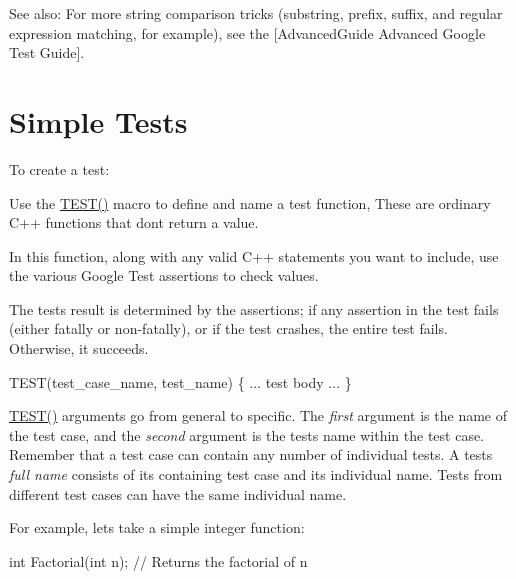 See also\+: For more string comparison tricks (substring, prefix, suffix, and regular expression matching, for example), see the \mbox{[}Advanced\+Guide Advanced Google Test Guide\mbox{]}.

\section*{Simple Tests}

To create a test\+:
\begin{DoxyEnumerate}
\item Use the {\ttfamily \hyperlink{gtest_8h_ad8b332753515c0ab8baada563c2547eb}{T\+E\+S\+T()}} macro to define and name a test function, These are ordinary C++ functions that don\textquotesingle{}t return a value.
\end{DoxyEnumerate}
\begin{DoxyEnumerate}
\item In this function, along with any valid C++ statements you want to include, use the various Google Test assertions to check values.
\end{DoxyEnumerate}
\begin{DoxyEnumerate}
\item The test\textquotesingle{}s result is determined by the assertions; if any assertion in the test fails (either fatally or non-\/fatally), or if the test crashes, the entire test fails. Otherwise, it succeeds.
\end{DoxyEnumerate}


\begin{DoxyCode}
TEST(test\_case\_name, test\_name) \{
 ... test body ...
\}
\end{DoxyCode}


{\ttfamily \hyperlink{gtest_8h_ad8b332753515c0ab8baada563c2547eb}{T\+E\+S\+T()}} arguments go from general to specific. The {\itshape first} argument is the name of the test case, and the {\itshape second} argument is the test\textquotesingle{}s name within the test case. Remember that a test case can contain any number of individual tests. A test\textquotesingle{}s {\itshape full name} consists of its containing test case and its individual name. Tests from different test cases can have the same individual name.

For example, let\textquotesingle{}s take a simple integer function\+: 
\begin{DoxyCode}
int Factorial(int n); // Returns the factorial of n
\end{DoxyCode}


